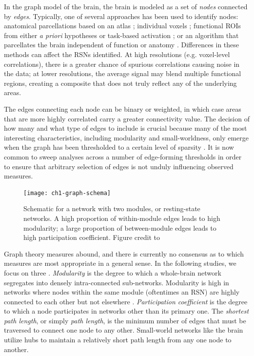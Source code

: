 In the graph model of the brain, the brain is modeled as a set of \textit{nodes} connected by \textit{edges}. Typically, one of several approaches has been used to identify nodes: anatomical parcellations based on an atlas \citep{Supekar2008, Liu2008, Lynall2010}; individual voxels \citep{Fair2007}; functional ROIs from either \textit{a priori} hypotheses or task-based activation \citep{VandenHeuvel2010}; or an algorithm that parcellates the brain independent of function or anatomy \citep{Goni2014}. Differences in these methods can affect the RSNs identified. At high resolutions (e.g. voxel-level correlations), there is a greater chance of spurious correlations causing noise in the data; at lower resolutions, the average signal may blend multiple functional regions, creating a composite that does not truly reflect any of the underlying areas. 

The edges connecting each node can be binary or weighted, in which case areas that are more highly correlated carry a greater connectivity value. The decision of how many and what type of edges to include is crucial because many of the most interesting characteristics, including modularity and small-worldness, only emerge when the graph has been thresholded to a certain level of sparsity \citep{Moussa2012}. It is now common to sweep analyses across a number of edge-forming thresholds in order to ensure that arbitrary selection of edges is not unduly influencing observed measures.

\begin{figure}[t]
    \centering
    \texttt{[image: ch1-graph-schema]}
    \caption[Schematic for a network with two modules]{Schematic for a network with two modules, or resting-state networks. A high proportion of within-module edges leads to high modularity; a large proportion of between-module edges leads to high participation coefficient. Figure credit to \cite{Godwin2016}}
    \label{fig:ch1-graph-schema}
\end{figure}

Graph theory measures abound, and there is currently no consensus as to which measures are most appropriate in a general sense. In the following studies, we focus on three \citep{Rubinov2010}. \textit{Modularity} is the degree to which a whole-brain network segregates into densely intra-connected sub-networks. Modularity is high in networks where nodes within the same module (oftentimes an RSN) are highly connected to each other but not elsewhere \citep{Sporns2013}. \textit{Participation coefficient} is the degree to which a node participates in networks other than its primary one. The \textit{shortest path length}, or simply \textit{path length}, is the minimum number of edges that must be traversed to connect one node to any other. Small-world networks like the brain utilize hubs to maintain a relatively short path length from any one node to another. 

